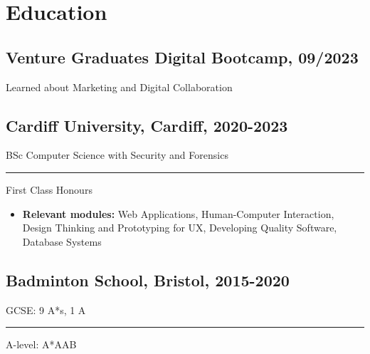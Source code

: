 \documentclass[11pt]{article}
\newcommand{\verticalline}[1][1pt]{\rule[-0.35ex]{#1}{0.9em}}
\begin{document}
    \section{Education}
    \subsection{Venture Graduates Digital Bootcamp, 09/2023}Learned about Marketing and Digital Collaboration 
    \subsection{Cardiff University, Cardiff, 2020-2023} 
    BSc Computer Science with Security and Forensics  \verticalline{} First Class Honours
    \begin{itemize}[itemsep=0pt, leftmargin=1em,topsep=-\parskip]
        \item \textbf{Relevant modules:} Web Applications, Human-Computer Interaction, Design Thinking and Prototyping for UX, Developing Quality Software, Database Systems
    \end{itemize}
    \subsection{Badminton School, Bristol, 2015-2020}
    GCSE: 9 A*s, 1 A \verticalline{} A-level: A*AAB
\end{document}
